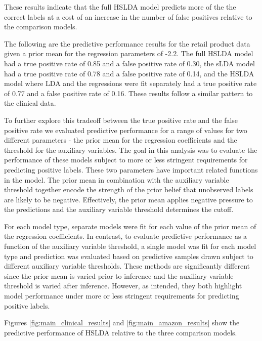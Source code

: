 These results indicate that the full HSLDA model predicts more of the the
correct labels at a cost of an increase in the number of false positives
relative to the comparison models.

The following are the predictive performance results for the retail product
data given a prior mean for the regression parameters of -2.2. 
The full HSLDA model had a true positive rate of 0.85 
and a false positive rate of 0.30, the sLDA model had a true positive
rate of 0.78 and a false positive rate of 0.14, and the HSLDA model where
LDA and the regressions were fit separately had a true positive rate of 0.77
and a false positive rate of 0.16. These results follow a similar pattern to the clinical data.

To further explore this tradeoff between the true positive rate and the
false positive rate we evaluated predictive performance for a range of values
for two different parameters - the prior mean for the regression coefficients
and the threshold for the auxiliary variables.  The goal in this analysis
was to evaluate the performance of these models subject to more or less
stringent requirements for predicting positive labels. These two parameters 
have important related functions in the model. The prior mean in combination 
with the auxiliary variable threshold together encode the strength of the prior
belief that unobserved labels are likely to be negative. Effectively, the
prior mean applies negative pressure to the predictions and the auxiliary
variable threshold determines the cutoff.

For each model type, separate models were fit for each value of the 
prior mean of the regression coefficients.  In contrast, to evaluate
predictive performance as a function of the auxiliary variable threshold,
a single model was fit for each model type and prediction was evaluated
based on predictive samples drawn subject to different auxiliary variable
thresholds. These methods are significantly different since the prior mean
is varied prior to inference and the auxiliary variable threshold is varied
after inference.  However, as intended, they both highlight model performance
under more or less stringent requirements for predicting positive labels.




Figures \ref{fig:main_clinical_results} and \ref{fig:main_amazon_results} show the predictive performance
of HSLDA relative to the three comparison models.

